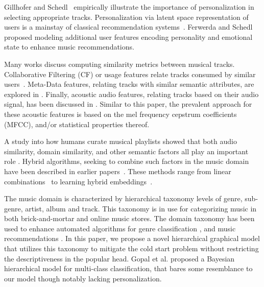 Gillhofer and Schedl~\cite{Gillhofer2015} empirically illustrate the importance of personalization in selecting appropriate tracks. Personalization via latent space representation of users is a mainstay of classical recommendation systems~\cite{KorenBV09}. Ferwerda and Schedl~\cite{personalized_playlist_schedl} proposed modeling additional user features encoding personality and emotional state to enhance music recommendations.


Many works discuss computing similarity metrics between musical tracks. Collaborative Filtering (CF) or usage features relate tracks consumed by similar users~\cite{item2vec,Dror2011,Mcfee_learningsimilarity_CF}. Meta-Data features, relating tracks with similar semantic attributes, are explored in \cite{Bogdanov_content,  McfeeEtAl_2009_HeteEmbeForSubj, Pauws:ISMIR02,SlaneyEtAl_2008_LearAMetrFor}. Finally, acoustic audio features, relating tracks based on their audio signal, has been discussed in \cite{DoplerEtAl_2008_AcceMusiCollVia, Lee2011,a2mf}. Similar to this paper, the prevalent approach for these acoustic features is based on the mel frequency cepstrum coefficients (MFCC), and/or statistical properties thereof.

A study into how humans curate musical playlists showed that both audio similarity, domain similarity, and other semantic factors all play an important role \cite{Cunningham:06}. 
Hybrid algorithms, seeking to combine such factors in the music domain have been described in earlier papers~\cite{Knees:2006, Mcfee_learningsimilarity_CF,McFee_multi_similarities,Schedl:2015}. These methods range from linear combinations~\cite{Knees:2006} to learning hybrid embeddings~\cite{McFee_multi_similarities}.


The music domain is characterized by hierarchical taxonomy levels of genre, sub-genre, artist, album and track. This taxonomy is in use for categorizing music in both brick-and-mortar and online music stores. The domain taxonomy has been used to enhance automated algorithms for genre classification \cite{DecoroEtAl_2007_BayeAggrForHier}, and music recommendations \cite{Dror2011,Mnih2012}.
In this paper, we propose a novel hierarchical graphical model that utilizes this taxonomy to mitigate the cold start problem without restricting the descriptiveness in the popular head.
Gopal et al. \cite{NIPS2012_4609} proposed a Bayesian hierarchical model for multi-class classification, that bares some resemblance to our model though notably lacking personalization.


